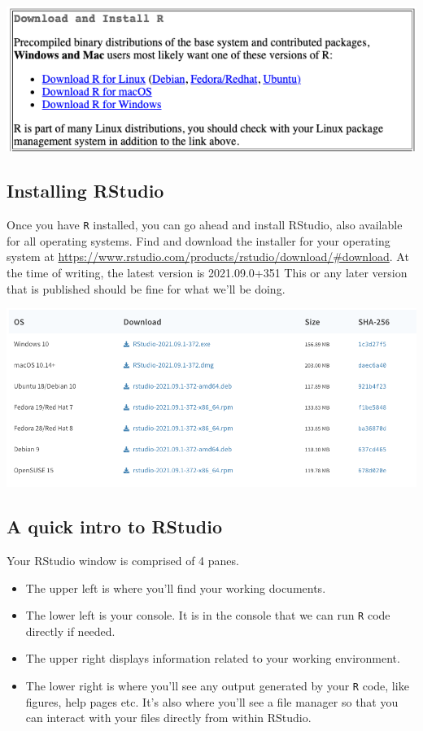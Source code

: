 \documentclass[
]{book}
\providecommand{\tightlist}{%
  \setlength{\itemsep}{0pt}\setlength{\parskip}{0pt}}
\begin{document}
\includegraphics{images/Install-R_20220101.png}

\hypertarget{installing-rstudio}{%
\subsection*{Installing RStudio}\label{installing-rstudio}}

Once you have \texttt{R} installed, you can go ahead and install RStudio, also available for all operating systems. Find and download the installer for your operating system at \url{https://www.rstudio.com/products/rstudio/download/\#download}. At the time of writing, the latest version is 2021.09.0+351 This or any later version that is published should be fine for what we'll be doing.

\includegraphics{images/Install-RStudio_20220101.png}

\hypertarget{a-quick-intro-to-rstudio}{%
\subsection*{A quick intro to RStudio}\label{a-quick-intro-to-rstudio}}

Your RStudio window is comprised of 4 panes.

\begin{itemize}
\tightlist
\item
  The upper left is where you'll find your working documents.
\item
  The lower left is your console. It is in the console that we can run \texttt{R} code directly if needed.
\item
  The upper right displays information related to your working environment.
\item
  The lower right is where you'll see any output generated by your \texttt{R} code, like figures, help pages etc. It's also where you'll see a file manager so that you can interact with your files directly from within RStudio.
\end{itemize}
\end{document}
